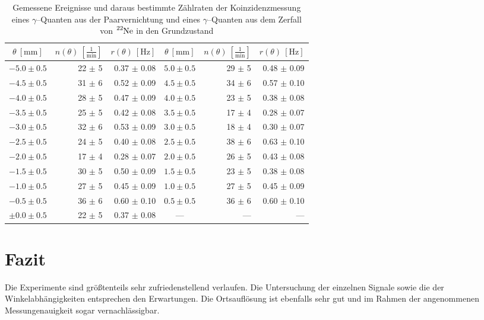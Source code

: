 \documentclass[12pt,a4paper]{scrartcl}
\numberwithin{equation}{section} %
\begin{document}
\begin{table}[h!]
	\centering
	\begin{tabular}{c|r|r||c|r|r}
		$\theta\ [\mathrm{mm}]$ & $n(\theta)\ [\frac{1}{\mathrm{min}}]$ & $r(\theta)\ [\mathrm{Hz}]$ &
			$\theta\ [\mathrm{mm}]$ & $n(\theta)\ [\frac{1}{\mathrm{min}}]$ & $r(\theta)\ [\mathrm{Hz}]$ \vspace{1pt}\\
		\hline 
		$-5.0 \pm 0.5$ & 22 $\pm$ 5 & 0.37 $\pm$ 0.08 &
			$5.0 \pm 0.5$ & 29 $\pm$ 5 & 0.48 $\pm$ 0.09 \\
		$-4.5 \pm 0.5$ & 31 $\pm$ 6 & 0.52 $\pm$ 0.09 &
			$4.5 \pm 0.5$ & 34 $\pm$ 6 & 0.57 $\pm$ 0.10 \\
		$-4.0 \pm 0.5$ & 28 $\pm$ 5 & 0.47 $\pm$ 0.09 &
			$4.0 \pm 0.5$ & 23 $\pm$ 5 & 0.38 $\pm$ 0.08 \\
		$-3.5 \pm 0.5$ & 25 $\pm$ 5 & 0.42 $\pm$ 0.08 &
			$3.5 \pm 0.5$ & 17 $\pm$ 4 & 0.28 $\pm$ 0.07 \\
		$-3.0 \pm 0.5$ & 32 $\pm$ 6 & 0.53 $\pm$ 0.09 &
			$3.0 \pm 0.5$ & 18 $\pm$ 4 & 0.30 $\pm$ 0.07 \\
		$-2.5 \pm 0.5$ & 24 $\pm$ 5 & 0.40 $\pm$ 0.08 &
			$2.5 \pm 0.5$ & 38 $\pm$ 6 & 0.63 $\pm$ 0.10 \\
		$-2.0 \pm 0.5$ & 17 $\pm$ 4 & 0.28 $\pm$ 0.07 &
			$2.0 \pm 0.5$ & 26 $\pm$ 5 & 0.43 $\pm$ 0.08 \\
		$-1.5 \pm 0.5$ & 30 $\pm$ 5 & 0.50 $\pm$ 0.09 &
			$1.5 \pm 0.5$ & 23 $\pm$ 5 & 0.38 $\pm$ 0.08 \\
		$-1.0 \pm 0.5$ & 27 $\pm$ 5 & 0.45 $\pm$ 0.09 &
			$1.0 \pm 0.5$ & 27 $\pm$ 5 & 0.45 $\pm$ 0.09 \\
		$-0.5 \pm 0.5$ & 36 $\pm$ 6 & 0.60 $\pm$ 0.10 &
			$0.5 \pm 0.5$ & 36 $\pm$ 6 & 0.60 $\pm$ 0.10 \\
		$\pm 0.0 \pm 0.5$ & 22 $\pm$ 5 & 0.37 $\pm$ 0.08 &---&---&---
	\end{tabular}
	\caption{Gemessene Ereignisse und daraus bestimmte Zählraten der Koinzidenzmessung eines $\gamma$--Quanten aus der Paarvernichtung und eines $\gamma$--Quanten aus dem Zerfall von $\ce{^{22}Ne}$ in den Grundzustand}
	\label{table:messwerte1275}
\end{table}

\clearpage
\hypertarget{fazit}{%
\section{Fazit}\label{fazit}}
Die Experimente sind größtenteils sehr zufriedenstellend verlaufen. Die Untersuchung der einzelnen Signale sowie die der Winkelabhängigkeiten entsprechen den Erwartungen. Die Ortsauflösung ist ebenfalls sehr gut und im Rahmen der angenommenen Messungenauigkeit sogar vernachlässigbar.
\end{document}
